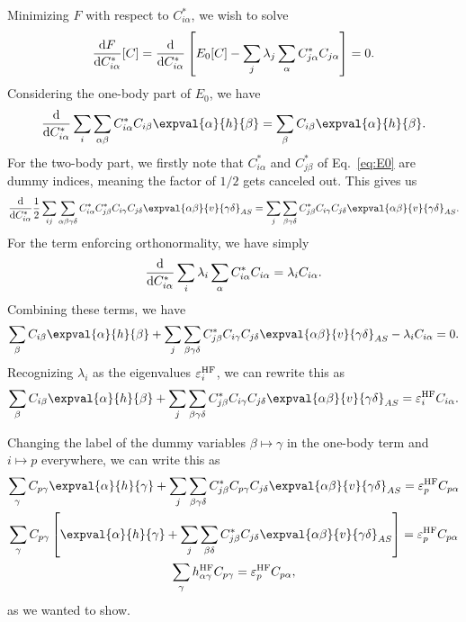 Minimizing $F$ with respect to $C^*_{i\alpha}$, we wish to solve
\begin{equation*}
    \frac{\mathop{}\!\mathrm{d} F}{\mathop{}\!\mathrm{d} C^*_{i\alpha}}[C] = \frac{\mathop{}\!\mathrm{d}}{\mathop{}\!\mathrm{d} C_{i \alpha}^*} \left[ E_0[C] - \sum_j \lambda_j \sum_{\alpha} C_{j \alpha}^* C_{j \alpha} \right] = 0.
\end{equation*}
Considering the one-body part of $E_0$, we have
\begin{equation*}
    \frac{\diff}{\diff C_{i \alpha}^*} \sum_{i} \sum_{\alpha\beta} C_{i \alpha}^* C_{i \beta}  \expval{\alpha}{h}{\beta} = \sum_{\beta} C_{i \beta} \expval{\alpha}{h}{\beta}.
\end{equation*}
For the two-body part, we firstly note that $C_{i \alpha}^*$ and $C_{j \beta}^*$ of Eq.~\eqref{eq:E0} are dummy indices, meaning the factor of $1/2$ gets canceled out.
This gives us
\begin{equation*}
    \frac{\diff}{\diff C_{i \alpha}^*} \frac{1}{2} \sum_{ij} \sum_{\alpha\beta\gamma\delta} C_{i \alpha}^* C_{j \beta}^* C_{i \gamma} C_{j \delta} \expval{\alpha\beta}{v}{\gamma\delta}_{AS} = \sum_j \sum_{\beta\gamma\delta} C_{j \beta}^* C_{i \gamma} C_{j \delta} \expval{\alpha\beta}{v}{\gamma\delta}_{AS}.
\end{equation*}
For the term enforcing orthonormality, we have simply
\begin{equation*}
    \frac{\mathop{}\!\mathrm{d}}{\mathop{}\!\mathrm{d} C_{i \alpha}^*} \sum_{i} \lambda_i \sum_{\alpha} C_{i \alpha}^* C_{i \alpha} = \lambda_i C_{i \alpha}.
\end{equation*}
Combining these terms, we have
\begin{equation*}
    \sum_{\beta} C_{i \beta} \expval{\alpha}{h}{\beta} + \sum_j \sum_{\beta\gamma\delta} C_{j \beta}^* C_{i \gamma} C_{j \delta} \expval{\alpha\beta}{v}{\gamma\delta}_{AS} - \lambda_i C_{i \alpha} = 0.
\end{equation*}
Recognizing $\lambda_i$ as the eigenvalues $\varepsilon_i^{\mathrm{HF}}$, we can rewrite this as
\begin{equation*}
    \sum_{\beta} C_{i \beta} \expval{\alpha}{h}{\beta} + \sum_j \sum_{\beta\gamma\delta} C_{j \beta}^* C_{i \gamma} C_{j \delta} \expval{\alpha\beta}{v}{\gamma\delta}_{AS} = \varepsilon_i^\HF C_{i \alpha}.
\end{equation*}

Changing the label of the dummy variables $\beta \mapsto \gamma$ in the one-body term and $i \mapsto p$ everywhere, we can write this as
\begin{gather*}
    \sum_{\gamma} C_{p \gamma} \expval{\alpha}{h}{\gamma} + \sum_j \sum_{\beta\gamma\delta} C_{j \beta}^* C_{p \gamma} C_{j \delta} \expval{\alpha\beta}{v}{\gamma\delta}_{AS} = \varepsilon_p^\HF C_{p \alpha} \\
    \sum_{\gamma} C_{p \gamma} \left[ \expval{\alpha}{h}{\gamma} + \sum_j \sum_{\beta\delta} C_{j \beta}^*  C_{j \delta} \expval{\alpha\beta}{v}{\gamma\delta}_{AS} \right] = \varepsilon_p^\HF C_{p \alpha} \\
    \sum_{\gamma} h_{\alpha\gamma}^\HF C_{p \gamma} = \varepsilon_p^\HF C_{p \alpha},
\end{gather*}
as we wanted to show.

